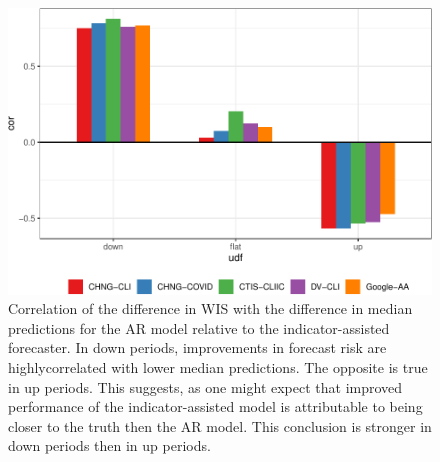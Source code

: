 \documentclass[9pt,twoside,lineno]{pnas-new}
\begin{document}
\clearpage

\clearpage

\begin{figure}

{\centering \includegraphics[width=\textwidth]{fig/upswing-corr-table-1} 

}

\caption{Correlation of the difference in WIS with the difference in median predictions for the AR model relative to the indicator-assisted forecaster. In down periods, improvements in forecast risk are highlycorrelated with lower median predictions. The opposite is true in up periods. This suggests, as one might expect that improved performance of the indicator-assisted model is attributable to being closer to the truth then the AR model. This conclusion is stronger in down periods then in up periods.}\label{fig:upswing-corr-table}
\end{figure}

\clearpage
\end{document}
